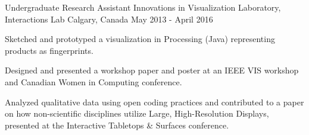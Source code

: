 \begin{cventries}
  \cventry
    {Undergraduate Research Assistant}
    {Innovations in Visualization Laboratory, Interactions Lab}
    {Calgary, Canada}
    {May 2013 - April 2016}
    {
      \begin{cvitems}
        \item {Sketched and prototyped a visualization in Processing (Java) representing products as fingerprints.}
        \item {Designed and presented a workshop paper and poster at an IEEE VIS workshop and Canadian Women in Computing conference.}
        \item {Analyzed qualitative data using open coding practices and contributed to a paper on how non-scientific disciplines utilize Large, High-Resolution Displays, presented at the Interactive Tabletops \& Surfaces conference.}
      \end{cvitems}
    }

 \end{cventries}
